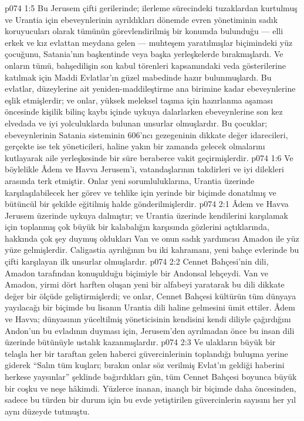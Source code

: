 \vs p074 1:5 Bu Jerusem çifti gerilerinde; ilerleme sürecindeki tuzaklardan kurtulmuş ve Urantia için ebeveynlerinin ayrıldıkları dönemde evren yönetiminin sadık koruyucuları olarak tümünün görevlendirilmiş bir konumda bulunduğu --- elli erkek ve kız evlattan meydana gelen --- muhteşem yaratılmışlar biçimindeki yüz çocuğunu, Satania’nın başkentinde veya başka yerleşkelerde bırakmışlardı. Ve onların tümü, bahşedilişin son kabul törenleri kapsamındaki veda gösterilerine katılmak için Maddi Evlatlar’ın güzel mabedinde hazır bulunmuşlardı. Bu evlatlar, düzeylerine ait yeniden\hyp{}maddileştirme ana birimine kadar ebeveynlerine eşlik etmişlerdir; ve onlar, yüksek meleksel taşıma için hazırlanma aşaması öncesinde kişilik bilinç kaybı içinde uykuya dalarlarken ebeveynlerine son kez elvedada ve iyi yolculuklarda bulunan unsurlar olmuşlardır. Bu çocuklar; ebeveynlerinin Satania sisteminin 606’ncı gezegeninin dikkate değer idarecileri, gerçekte ise tek yöneticileri, haline yakın bir zamanda gelecek olmalarını kutlayarak aile yerleşkesinde bir süre beraberce vakit geçirmişlerdir.
\vs p074 1:6 Ve böylelikle Âdem ve Havva Jerusem’i, vatandaşlarının takdirleri ve iyi dilekleri arasında terk etmiştir. Onlar yeni sorumluluklarına, Urantia üzerinde karşılaşılabilecek her görev ve tehlike için yerinde bir biçimde donatılmış ve bütüncül bir şekilde eğitilmiş halde gönderilmişlerdir.
\vs p074 2:1 Âdem ve Havva Jerusem üzerinde uykuya dalmıştır; ve Urantia üzerinde kendilerini karşılamak için toplanmış çok büyük bir kalabalığın karşısında gözlerini açtıklarında, hakkında çok şey duymuş oldukları Van ve onun sadık yardımcısı Amadon ile yüz yüze gelmişlerdir. Caligastia ayrılığının bu iki kahramanı, yeni bahçe evlerinde bu çifti karşılayan ilk unsurlar olmuşlardır.
\vs p074 2:2 Cennet Bahçesi’nin dili, Amadon tarafından konuşulduğu biçimiyle bir Andonsal lehçeydi. Van ve Amadon, yirmi dört harften oluşan yeni bir alfabeyi yaratarak bu dili dikkate değer bir ölçüde geliştirmişlerdi; ve onlar, Cennet Bahçesi kültürün tüm dünyaya yayılacağı bir biçimde bu lisanın Urantia dili haline gelmesini ümit ettiler. Âdem ve Havva; dünyasının yüceltilmiş yöneticisinin kendisini kendi diliyle çağırdığını Andon’un bu evladının duyması için, Jerusem’den ayrılmadan önce bu insan dili üzerinde bütünüyle ustalık kazanmışlardır.
\vs p074 2:3 Ve ulakların büyük bir telaşla her bir taraftan gelen haberci güvercinlerinin toplandığı buluşma yerine giderek “Salın tüm kuşları; bırakın onlar söz verilmiş Evlat’ın geldiği haberini herkese yaysınlar” şeklinde bağırdıkları gün, tüm Cennet Bahçesi boyunca büyük bir coşku ve neşe hâkimdi. Yüzlerce inanan, inançlı bir biçimde daha öncesinden, sadece bu türden bir durum için bu evde yetiştirilen güvercinlerin sayısını her yıl aynı düzeyde tutmuştu.

